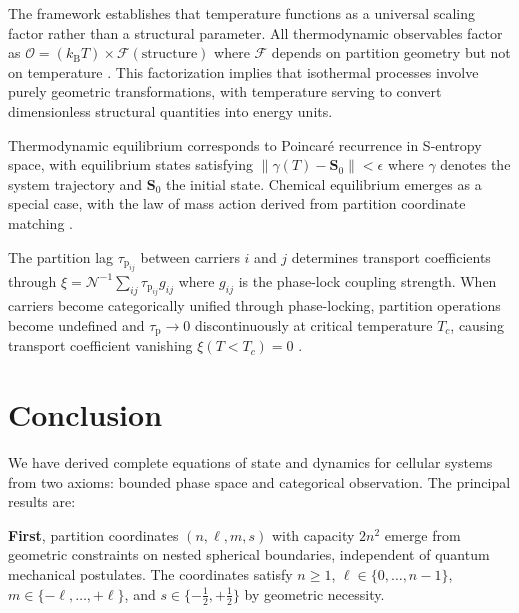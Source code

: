 \documentclass[12pt,a4paper]{article}
\theoremstyle{plain}
\theoremstyle{definition}
\theoremstyle{remark}
\newcommand{\kB}{k_{\mathrm{B}}}
\newcommand{\Scoord}{\mathbf{S}}
\newcommand{\taulag}{\tau_{\mathrm{p}}}
\begin{document}
The framework establishes that temperature functions as a universal scaling factor rather than a structural parameter. All thermodynamic observables factor as $\mathcal{O} = (\kB T) \times \mathcal{F}(\text{structure})$ where $\mathcal{F}$ depends on partition geometry but not on temperature \citep{callen1985thermodynamics}. This factorization implies that isothermal processes involve purely geometric transformations, with temperature serving to convert dimensionless structural quantities into energy units.

Thermodynamic equilibrium corresponds to Poincaré recurrence in S-entropy space, with equilibrium states satisfying $\|\gamma(T) - \Scoord_0\| < \epsilon$ where $\gamma$ denotes the system trajectory and $\Scoord_0$ the initial state. Chemical equilibrium emerges as a special case, with the law of mass action derived from partition coordinate matching \citep{haldane1930enzymes}.

The partition lag $\taulag_{ij}$ between carriers $i$ and $j$ determines transport coefficients through $\xi = \mathcal{N}^{-1} \sum_{ij} \taulag_{ij} g_{ij}$ where $g_{ij}$ is the phase-lock coupling strength. When carriers become categorically unified through phase-locking, partition operations become undefined and $\taulag \to 0$ discontinuously at critical temperature $T_c$, causing transport coefficient vanishing $\xi(T < T_c) = 0$ \citep{bardeen1957theory,landau1941theory}.

\section{Conclusion}
\label{sec:conclusion}

We have derived complete equations of state and dynamics for cellular systems from two axioms: bounded phase space and categorical observation. The principal results are:

\textbf{First}, partition coordinates $(n,\ell,m,s)$ with capacity $2n^2$ emerge from geometric constraints on nested spherical boundaries, independent of quantum mechanical postulates. The coordinates satisfy $n \geq 1$, $\ell \in \{0,\ldots,n-1\}$, $m \in \{-\ell,\ldots,+\ell\}$, and $s \in \{-\tfrac{1}{2},+\tfrac{1}{2}\}$ by geometric necessity.
\end{document}
